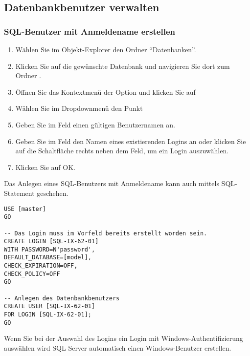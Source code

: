         \subsection{Datenbankbenutzer verwalten}
          \label{administer_database_users}
          \subsubsection{SQL-Benutzer mit Anmeldename erstellen}
            \begin{enumerate}
              \item Wählen Sie im Objekt-Explorer den Ordner
              \enquote{Datenbanken}.
              \item Klicken Sie auf die gewünschte Datenbank und navigieren
              Sie dort zum Ordner .
              \item Öffnen Sie das Kontextmenü der Option 
              und klicken Sie auf 
              \item Wählen Sie im Dropdownmenü  den Punkt
              \item Geben Sie im Feld  einen gültigen
              Benutzernamen an.
              \item Geben Sie im Feld  den Namen eines
              existierenden Logins an oder klicken Sie auf die Schaltfläche
              rechts neben dem Feld, um ein Login auszuwählen.
              \item Klicken Sie auf OK.
            \end{enumerate}
            Das Anlegen eines SQL-Benutzers mit Anmeldename kann auch mittels
            SQL-Statement geschehen.
            \begin{lstlisting}[language=ms_sql, caption={Anlegen eines
            SQL-Benutzers mit Anmeldename}, label=admin19_12]
USE [master]
GO

-- Das Login muss im Vorfeld bereits erstellt worden sein.
CREATE LOGIN [SQL-IX-62-01]
WITH PASSWORD=N'password', 
DEFAULT_DATABASE=[model], 
CHECK_EXPIRATION=OFF, 
CHECK_POLICY=OFF
GO

-- Anlegen des Datenbankbenutzers
CREATE USER [SQL-IX-62-01]
FOR LOGIN [SQL-IX-62-01];
GO
            \end{lstlisting}
\clearpage
            \begin{merke}
              Wenn Sie bei der Auswahl des Logins ein Login mit
              Windows-Authentifizierung auswählen wird SQL Server automatisch
              einen Windows-Benutzer erstellen.
            \end{merke}            
